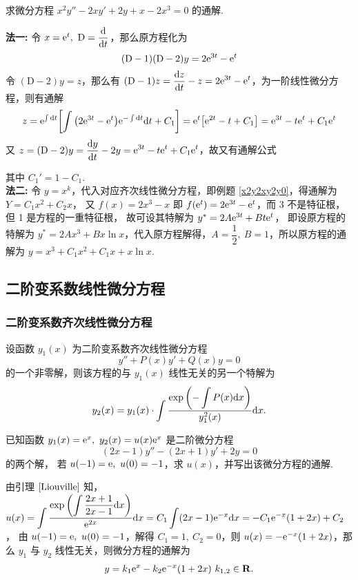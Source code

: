 \begin{example}
    求微分方程 $x^2y''-2xy'+2y+x-2x^3=0$ 的通解.
\end{example}
\begin{solution}
    \textbf{法一: }令 $x=\mathrm{e} ^t,~\mathrm{D}=\displaystyle\dv{t}$，那么原方程化为
    $$(\mathrm{D}-1)(\mathrm{D}-2)y=2\mathrm{e} ^{3t}-\mathrm{e} ^t$$
    令 $(\mathrm{D}-2)y=z$，那么有 $(\mathrm{D}-1)z=\displaystyle\dv{z}{t}-z=2\mathrm{e} ^{3t}-\mathrm{e} ^t$，为一阶线性微分方程，则有通解
    $$z=\mathrm{e} ^{\int\dd t}\qty[\int\qty(2\mathrm{e} ^{3t}-\mathrm{e} ^t)\mathrm{e} ^{-\int\dd t}\dd t+C_1]=\mathrm{e} ^t\qty[\mathrm{e} ^{2t}-t+C_1]=\mathrm{e} ^{3t}-t\mathrm{e} ^{t}+C_1\mathrm{e} ^t$$
    又 $z=(\mathrm{D}-2)y=\displaystyle\dv{y}{t}-2y=\mathrm{e} ^{3t}-t\mathrm{e} ^{t}+C_1\mathrm{e} ^t$，故又有通解公式
    其中 $C_1'=1-C_1.$\\
    \textbf{法二: }令 $y=x^k$，代入对应齐次线性微分方程，即例题 \ref{x2y2xy2y0}，得通解为 $Y=C_1x^2+C_2x$，
    又 $f(x)=2x^3-x$ 即 $f\qty(\mathrm{e} ^t)=2\mathrm{e} ^{3t}-\mathrm{e} ^t$，而 3 不是特征根，但 1 是方程的一重特征根，
    故可设其特解为 $y^*=2A\mathrm{e} ^{3t}+Bt\mathrm{e} ^t$，
    即设原方程的特解为 $y^*=2Ax^3+Bx\ln x$，代入原方程解得，$A=\dfrac{1}{2},~B=1$，所以原方程的通解为
    $y=x^3+C_1x^2+C_1x+x\ln x.$
\end{solution}

\subsection{二阶变系数线性微分方程}

\subsubsection{二阶变系数齐次线性微分方程}

\begin{lemma}[Liouville 引理]
    \label{Liouville}设函数 $y_1(x)$ 为二阶变系数齐次线性微分方程 $$y''+P(x)y'+Q(x)y=0$$
    的一个非零解，则该方程的与 $y_1(x)$ 线性无关的另一个特解为
    $$y_2(x)=y_1(x)\cdot\int\dfrac{\exp\qty(-\displaystyle\int P(x)\dd x)}{y_1^2(x)}\dd x.$$
\end{lemma}

\begin{example}[2016 数二]
    已知函数 $y_1(x)=\mathrm{e} ^x,~y_2(x)=u(x)\mathrm{e} ^x$ 是二阶微分方程 $$(2x-1)y''-(2x+1)y'+2y=0$$ 的两个解，
    若 $u(-1)=\mathrm{e} ,~u(0)=-1$，求 $u(x)$，并写出该微分方程的通解.
\end{example}
\begin{solution}
    由引理 $\ref{Liouville}$ 知，$u(x)=\displaystyle\int\dfrac{\exp\qty(\displaystyle\int\dfrac{2x+1}{2x-1}\dd x)}{\mathrm{e} ^{2x}}\dd x=C_1\int(2x-1)\mathrm{e} ^{-x}\dd x=-C_1\mathrm{e} ^{-x}(1+2x)+C_2$，
    由 $u(-1)=\mathrm{e} ,~u(0)=-1$，解得 $C_1=1,~C_2=0$，则 $u(x)=-\mathrm{e} ^{-x}(1+2x)$，那么 $y_1$ 与 $y_2$ 线性无关，则微分方程的通解为
    $$y=k_1\mathrm{e} ^x-k_2\mathrm{e} ^{-x}(1+2x)~  k_{1,2}\in\mathbf{R}.$$
\end{solution}

